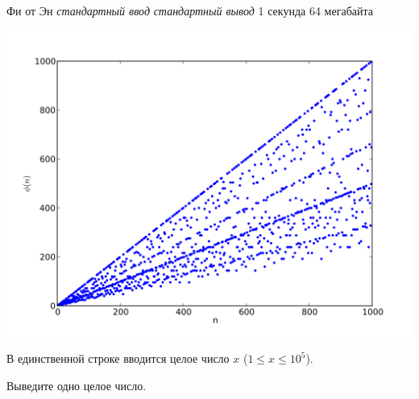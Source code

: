 \begin{problem}%
{Фи от Эн}%
{\textsl{стандартный ввод}}%
{\textsl{стандартный вывод}}%
{1 секунда}%
{64 мегабайта}{}

\begin{center}
\includegraphics[scale=0.5]{images/EulerPhi.png}
\end{center}

\InputFile

В единственной строке вводится целое число $x$ ($1 \le x \le 10^5$).

\OutputFile

Выведите одно целое число.

\Examples

\begin{example}
%
%
\end{example}
\end{problem}

